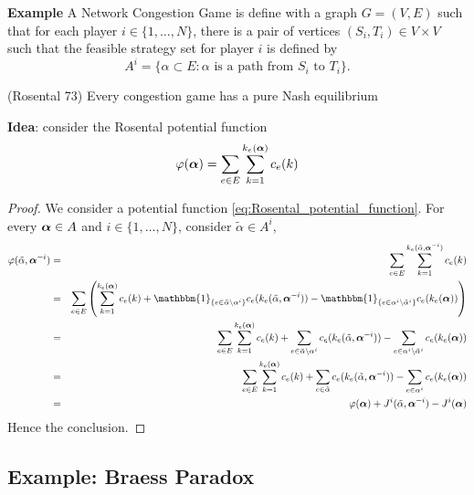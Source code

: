 \textbf{Example} A Network Congestion Game is define with a graph $G=(V,E)$ such that for each player $i \in \{1,\ldots, N\}$, there is a pair of vertices $(S_i, T_i)\in V \times V$ such that the feasible strategy set for player $i$ is defined by
$$
	A^i = \{ \alpha \subset E :  \alpha \text{ is a path from } S_i \text{ to } T_i \}.
$$


\begin{proposition}(Rosental 73)
	Every congestion game has a pure Nash equilibrium
\end{proposition}
\noindent \textbf{Idea}: consider the Rosental potential function 
\begin{equation}
	\varphi(\boldsymbol{\alpha}) = \sum_{e \in E} \sum_{k=1}^{k_e(\boldsymbol{\alpha})} c_e(k)
\label{eq:Rosental_potential_function}
\end{equation}

\begin{proof}
	We consider a potential function \eqref{eq:Rosental_potential_function}.  For every $\boldsymbol{\alpha} \in A$ and $i \in \{1, \ldots, N\}$, consider $\tilde{\alpha} \in A^i$,
	\begin{eqnarray}
		\varphi(\tilde{\alpha}, \balpha^{-i}) &=& \sum_{e \in E} \sum_{k=1}^{k_e(\tilde{\alpha}, \balpha^{-i})} c_e(k) \nonumber \\
		&=& \sum_{e \in E} \left( \sum_{k=1}^{k_e(\balpha)} c_e(k)  + \mathbbm{1}_{\{e \in \tilde{\alpha} \backslash \alpha^i \} } c_e(k_e(\tilde{\alpha}, \balpha^{-i})) - \mathbbm{1}_{ \{ e \in \alpha^i \backslash \tilde{\alpha}^i\}}  c_e(k_e( \balpha)) \right) \nonumber \\
		&=& \sum_{e \in E} \sum_{k=1}^{k_e(\balpha)} c_e(k) + \sum_{e \in \tilde{\alpha} \backslash \alpha^i } c_e( k_e( \tilde{\alpha}, \balpha^{-i})) - \sum_{e \in \alpha^i \backslash \tilde{\alpha}^i } c_e(k_e(\balpha)) \nonumber \\
		&=& \sum_{e \in E} \sum_{k=1}^{k_e(\balpha)} c_e(k) + \sum_{e \in \tilde{\alpha}} c_e( k_e( \tilde{\alpha}, \balpha^{-i})) - \sum_{e \in \alpha^i} c_e(k_e(\balpha)) \nonumber \\
		&=& \varphi(\balpha) + J^i(\tilde{\alpha}, \balpha^{-i}) - J^i(\balpha)
	\end{eqnarray}
Hence the conclusion.
\end{proof}

\subsection{Example: Braess Paradox}

